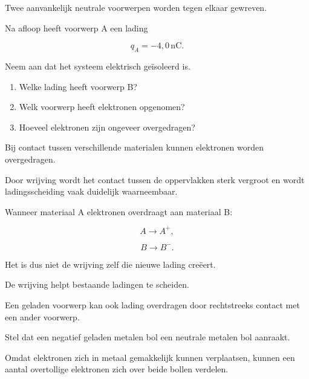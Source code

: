 \documentclass{ximera}
\begin{document}
\begin{oefening}[Ladingsoverdracht]{\oefU\ESS}

Twee aanvankelijk neutrale voorwerpen worden tegen elkaar gewreven.

Na afloop heeft voorwerp A een lading

\[
q_A=-4{,}0\,\mathrm{nC}.
\]

Neem aan dat het systeem elektrisch geïsoleerd is.

\begin{enumerate}
  \item Welke lading heeft voorwerp B?
  \item Welk voorwerp heeft elektronen opgenomen?
  \item Hoeveel elektronen zijn ongeveer overgedragen?
\end{enumerate}

\end{oefening}




Bij contact tussen verschillende materialen kunnen elektronen worden
overgedragen.

Door wrijving wordt het contact tussen de oppervlakken sterk vergroot
en wordt ladingsscheiding vaak duidelijk waarneembaar.

Wanneer materiaal A elektronen overdraagt aan materiaal B:

\[
A\longrightarrow A^+,
\]

\[
B\longrightarrow B^-.
\]

Het is dus niet de wrijving zelf die nieuwe lading creëert.

De wrijving helpt bestaande ladingen te scheiden.




Een geladen voorwerp kan ook lading overdragen door rechtstreeks
contact met een ander voorwerp.

Stel dat een negatief geladen metalen bol een neutrale metalen bol
aanraakt.

Omdat elektronen zich in metaal gemakkelijk kunnen verplaatsen, kunnen
een aantal overtollige elektronen zich over beide bollen verdelen.
\end{document}

